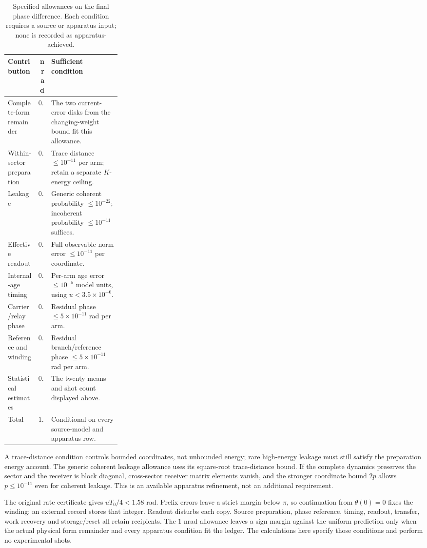 \begin{table}[htbp]\centering\small
\caption{Specified allowances on the final phase difference. Each condition requires a source or apparatus input; none is recorded as apparatus-achieved.}\label{tab:nanoradian-budget}
\begin{tabularx}{\linewidth}{@{}>{\raggedright\arraybackslash}p{0.27\linewidth}r>{\raggedright\arraybackslash}X@{}}\toprule
Contribution&nrad&Sufficient condition\\\midrule
Complete-form remainder&$0.20$&The two current-error disks from the changing-weight bound fit this allowance.\\
Within-sector preparation&$0.10$&Trace distance $\le10^{-11}$ per arm; retain a separate $K$-energy ceiling.\\
Leakage&$0.10$&Generic coherent probability $\le10^{-22}$; incoherent probability $\le10^{-11}$ suffices.\\
Effective readout&$0.10$&Full observable norm error $\le10^{-11}$ per coordinate.\\
Internal-age timing&$0.10$&Per-arm age error $\le10^{-5}$ model units, using $u<3.5\times10^{-6}$.\\
Carrier/relay phase&$0.10$&Residual phase $\le5\times10^{-11}$ rad per arm.\\
Reference and winding&$0.10$&Residual branch/reference phase $\le5\times10^{-11}$ rad per arm.\\
Statistical estimates&$0.20$&The twenty means and shot count displayed above.\\\midrule
Total&$1.00$&Conditional on every source-model and apparatus row.\\\bottomrule
\end{tabularx}\end{table}

A trace-distance condition controls bounded coordinates, not unbounded energy; rare high-energy leakage must still satisfy the preparation energy account. The generic coherent leakage allowance uses its square-root trace-distance bound. If the complete dynamics preserves the sector and the receiver is block diagonal, cross-sector receiver matrix elements vanish, and the stronger coordinate bound $2p$ allows $p\le10^{-11}$ even for coherent leakage. This is an available apparatus refinement, not an additional requirement.

The original rate certificate gives $uT_0/4<1.58$ rad. Prefix errors leave a strict margin below $\pi$, so continuation from $\theta(0)=0$ fixes the winding; an external record stores that integer. Readout disturbs each copy. Source preparation, phase reference, timing, readout, transfer, work recovery and storage/reset all retain recipients. The $1$ nrad allowance leaves a sign margin against the uniform prediction only when the actual physical form remainder and every apparatus condition fit the ledger. The calculations here specify those conditions and perform no experimental shots.
